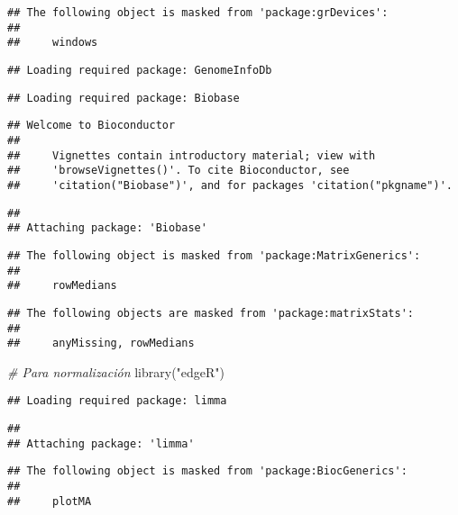 \documentclass[
]{article}
\newenvironment{Shaded}{\begin{snugshade}}{\end{snugshade}}
\newcommand{\CommentTok}[1]{\textcolor[rgb]{0.56,0.35,0.01}{\textit{#1}}}
\newcommand{\FunctionTok}[1]{\textcolor[rgb]{0.00,0.00,0.00}{#1}}
\newcommand{\NormalTok}[1]{#1}
\newcommand{\StringTok}[1]{\textcolor[rgb]{0.31,0.60,0.02}{#1}}
\begin{document}
\begin{verbatim}
## The following object is masked from 'package:grDevices':
## 
##     windows
\end{verbatim}

\begin{verbatim}
## Loading required package: GenomeInfoDb
\end{verbatim}

\begin{verbatim}
## Loading required package: Biobase
\end{verbatim}

\begin{verbatim}
## Welcome to Bioconductor
## 
##     Vignettes contain introductory material; view with
##     'browseVignettes()'. To cite Bioconductor, see
##     'citation("Biobase")', and for packages 'citation("pkgname")'.
\end{verbatim}

\begin{verbatim}
## 
## Attaching package: 'Biobase'
\end{verbatim}

\begin{verbatim}
## The following object is masked from 'package:MatrixGenerics':
## 
##     rowMedians
\end{verbatim}

\begin{verbatim}
## The following objects are masked from 'package:matrixStats':
## 
##     anyMissing, rowMedians
\end{verbatim}

\begin{Shaded}
\begin{Highlighting}[]
\CommentTok{\# Para normalización}
\FunctionTok{library}\NormalTok{(}\StringTok{"edgeR"}\NormalTok{)}
\end{Highlighting}
\end{Shaded}

\begin{verbatim}
## Loading required package: limma
\end{verbatim}

\begin{verbatim}
## 
## Attaching package: 'limma'
\end{verbatim}

\begin{verbatim}
## The following object is masked from 'package:BiocGenerics':
## 
##     plotMA
\end{verbatim}
\end{document}
